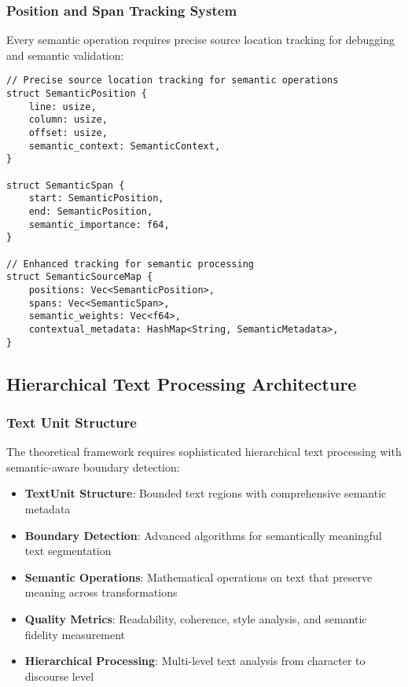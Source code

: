 \documentclass[12pt,a4paper,twoside]{article}
\begin{document}
\subsubsection{Position and Span Tracking System}

Every semantic operation requires precise source location tracking for debugging and semantic validation:

\begin{lstlisting}[caption=Comprehensive Position Tracking System]
// Precise source location tracking for semantic operations
struct SemanticPosition {
    line: usize,
    column: usize,
    offset: usize,
    semantic_context: SemanticContext,
}

struct SemanticSpan {
    start: SemanticPosition,
    end: SemanticPosition,
    semantic_importance: f64,
}

// Enhanced tracking for semantic processing
struct SemanticSourceMap {
    positions: Vec<SemanticPosition>,
    spans: Vec<SemanticSpan>,
    semantic_weights: Vec<f64>,
    contextual_metadata: HashMap<String, SemanticMetadata>,
}
\end{lstlisting}

\subsection{Hierarchical Text Processing Architecture}

\subsubsection{Text Unit Structure}

The theoretical framework requires sophisticated hierarchical text processing with semantic-aware boundary detection:

\begin{itemize}
\item \textbf{TextUnit Structure}: Bounded text regions with comprehensive semantic metadata
\item \textbf{Boundary Detection}: Advanced algorithms for semantically meaningful text segmentation
\item \textbf{Semantic Operations}: Mathematical operations on text that preserve meaning across transformations
\item \textbf{Quality Metrics}: Readability, coherence, style analysis, and semantic fidelity measurement
\item \textbf{Hierarchical Processing}: Multi-level text analysis from character to discourse level
\end{itemize}
\end{document}
